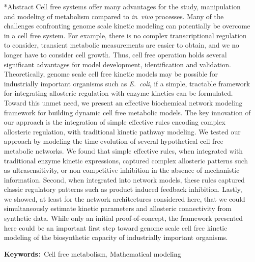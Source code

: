 \documentclass[12pt]{article}
\makeatletter
\renewcommand\section{\@startsection
	{subsection}{2}{0mm}
	{-0.2in}
	{0.05\baselineskip}
	{\normalfont\large\bfseries}}
\makeatother
\begin{document}
\section*{Abstract}
Cell free systems offer many advantages for the study, manipulation and modeling of metabolism compared to \textit{in~vivo} processes.
Many of the challenges confronting genome scale kinetic modeling can potentially be overcome in a cell free system. 
For example, there is no complex transcriptional regulation to consider, transient metabolic measurements are easier to obtain, and we no longer have to consider cell growth. 
Thus, cell free operation holds several significant advantages for model development, identification and validation.
Theoretically, genome scale cell free kinetic models may be possible for industrially important organisms such as \emph{E.~coli}, 
if a simple, tractable framework for integrating allosteric regulation with enzyme kinetics can be formulated. 
Toward this unmet need, we present an effective biochemical network modeling framework for building dynamic cell free metabolic models.
The key innovation of our approach is the integration of simple effective rules encoding complex allosteric regulation, with traditional kinetic pathway modeling.
We tested our approach by modeling the time evolution of several hypothetical cell free metabolic networks.
We found that simple effective rules, when integrated with traditional enzyme kinetic expressions,
captured complex allosteric patterns such as ultrasensitivity, or non-competitive inhibition in the absence of mechanistic information. 
Second, when integrated into network models, these rules captured classic regulatory patterns such as product induced feedback inhibition. 
Lastly, we showed, at least for the network architectures considered here, that we could 
simultaneously estimate kinetic parameters and allosteric connectivity from synthetic data.
While only an initial proof-of-concept, the framework presented here could be an important first step toward genome scale cell free kinetic modeling of the biosynthetic capacity 
of industrially important organisms.

{\noindent \textbf{Keywords:}~Cell free metabolism, Mathematical modeling}

\pagebreak

\setcounter{page}{1}

\linenumbers
\end{document}
